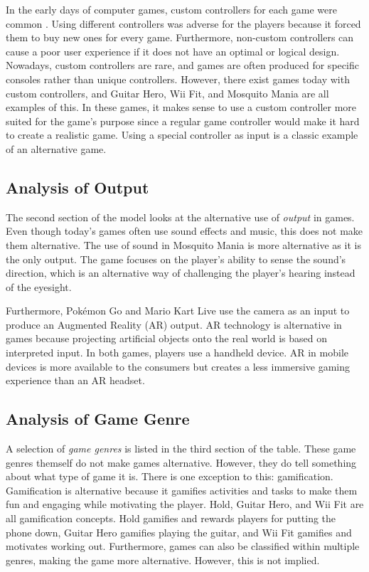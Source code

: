 In the early days of computer games, custom controllers for each game were common \citep{overmars_brief_2012}. Using different controllers was adverse for the players because it forced them to buy new ones for every game. Furthermore, non-custom controllers can cause a poor user experience if it does not have an optimal or logical design. Nowadays, custom controllers are rare, and games are often produced for specific consoles rather than unique controllers. However, there exist games today with custom controllers, and Guitar Hero, Wii Fit, and Mosquito Mania are all examples of this. In these games, it makes sense to use a custom controller more suited for the game's purpose since a regular game controller would make it hard to create a realistic game. Using a special controller as input is a classic example of an alternative game.

\subsection{Analysis of Output}
The second section of the model looks at the alternative use of \textit{output} in games. Even though today’s games often use sound effects and music, this does not make them alternative. The use of sound in Mosquito Mania is more alternative as it is the only output. The game focuses on the player's ability to sense the sound's direction, which is an alternative way of challenging the player's hearing instead of the eyesight.

Furthermore, Pokémon Go and Mario Kart Live use the camera as an input to produce an Augmented Reality (AR) output. AR technology is alternative in games because projecting artificial objects onto the real world is based on interpreted input. In both games, players use a handheld device. AR in mobile devices is more available to the consumers but creates a less immersive gaming experience than an AR headset.


\subsection{Analysis of Game Genre}
A selection of \textit{game genres} is listed in the third section of the table. These game genres themself do not make games alternative. However, they do tell something about what type of game it is. There is one exception to this: gamification. Gamification is alternative because it gamifies activities and tasks to make them fun and engaging while motivating the player. Hold, Guitar Hero, and Wii Fit are all gamification concepts. Hold gamifies and rewards players for putting the phone down, Guitar Hero gamifies playing the guitar, and Wii Fit gamifies and motivates working out. Furthermore, games can also be classified within multiple genres, making the game more alternative. However, this is not implied.

